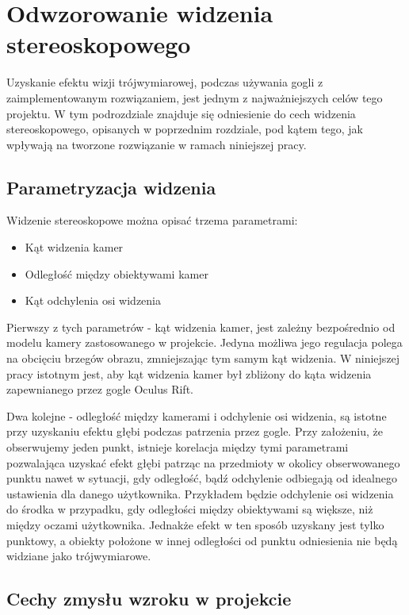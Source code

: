 \documentclass[a4paper,11pt,twoside]{report}
\theoremstyle{definition}
\begin{document}
\section{Odwzorowanie widzenia stereoskopowego}

Uzyskanie efektu wizji trójwymiarowej, podczas używania gogli z zaimplementowanym rozwiązaniem, jest jednym z najważniejszych celów tego projektu. W tym podrozdziale znajduje się odniesienie do cech widzenia stereoskopowego, opisanych w poprzednim rozdziale, pod kątem tego, jak wpływają na tworzone rozwiązanie w ramach niniejszej pracy. 

\subsection{Parametryzacja widzenia}
Widzenie stereoskopowe można opisać trzema parametrami:
\begin{itemize}
\item Kąt widzenia kamer
\item Odległość między obiektywami kamer
\item Kąt odchylenia osi widzenia
\end{itemize}

Pierwszy z tych parametrów - kąt widzenia kamer, jest zależny bezpośrednio od modelu kamery zastosowanego w projekcie. Jedyna możliwa jego regulacja polega na obcięciu brzegów obrazu, zmniejszając tym samym kąt widzenia. W niniejszej pracy istotnym jest, aby kąt widzenia kamer był zbliżony do kąta widzenia zapewnianego przez gogle Oculus Rift.

Dwa kolejne - odległość między kamerami i odchylenie osi widzenia, są istotne przy uzyskaniu efektu głębi podczas patrzenia przez gogle. Przy założeniu, że obserwujemy jeden punkt, istnieje korelacja między tymi parametrami pozwalająca uzyskać efekt głębi patrząc na przedmioty w okolicy obserwowanego punktu nawet w sytuacji, gdy odległość, bądź odchylenie odbiegają od idealnego ustawienia dla danego użytkownika. Przykładem będzie odchylenie osi widzenia do środka w przypadku, gdy odległości między obiektywami są większe, niż między oczami użytkownika. Jednakże efekt w ten sposób uzyskany jest tylko punktowy, a obiekty położone w innej odległości od punktu odniesienia nie będą widziane jako trójwymiarowe.

\subsection{Cechy zmysłu wzroku w projekcie}
\end{document}
